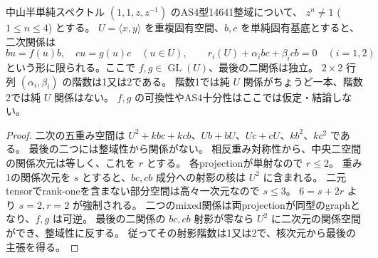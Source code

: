 \begin{proposition}[残るpencilの必要な関係atlas]
\label{prop:cubic-unit-repeated-pencil-relations}
中山半単純スペクトル $(1,1,z,z^{-1})$ のAS4型14641整域について、
$z^n\ne1$ ($1\le n\le4$) とする。
$U=\langle x,y\rangle$ を重複固有空間、$b,c$ を単純固有基底とすると、
二次関係は
\[
 b u=f(u)b,\quad c u=g(u)c\quad(u\in U),\qquad
 r_i(U)+\alpha_i bc+\beta_i cb=0\quad(i=1,2)
\]
という形に限られる。ここで $f,g\in\operatorname{GL}(U)$、最後の二関係は独立。
$2\times2$ 行列 $(\alpha_i,\beta_i)$ の階数は1又は2である。
階数1では純 $U$ 関係がちょうど一本、階数2では純 $U$ 関係はない。
$f,g$ の可換性やAS4十分性はここでは仮定・結論しない。
\end{proposition}
\begin{proof}
二次の五重み空間は
$U^2+kbc+kcb$、$Ub+bU$、$Uc+cU$、$kb^2$、$kc^2$ である。
最後の二つには整域性から関係がない。
相反重み対称性から、中央二空間の関係次元は等しく、これを $r$ とする。
各projectionが単射なので $r\le2$。
重み1の関係次元を $s$ とすると、$bc,cb$ 成分への射影の核は $U^2$ に含まれる。
二元tensorでrank-oneを含まない部分空間は高々一次元なので $s\le3$。
$6=s+2r$ より $s=2,r=2$ が強制される。
二つのmixed関係は両projectionが同型のgraphとなり、$f,g$ は可逆。
最後の二関係の $bc,cb$ 射影が零なら $U^2$ に二次元の関係空間ができ、整域性に反する。
従ってその射影階数は1又は2で、核次元から最後の主張を得る。
\end{proof}

